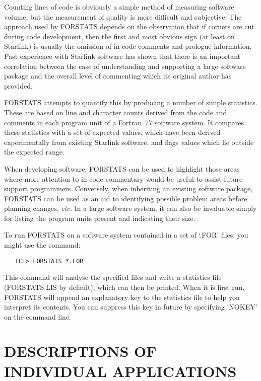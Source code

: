 Counting lines of code is obviously a simple method of measuring software
volume, but the measurement of quality is more difficult and subjective.
The approach used by FORSTATS depends on the observation that if corners are
cut during code development, then the first and most obvious sign (at least
on Starlink) is usually the omission of in-code comments and prologue
information.
Past experience with Starlink software has shown that there is an important
correlation between the ease of understanding and supporting a large
software package and the overall level of commenting which its original
author has provided.

FORSTATS attempts to quantify this by producing a number of simple
statistics.
These are based on line and character counts derived from the code and
comments in each program unit of a Fortran~77 software system.
It compares these statistics with a set of expected values, which have been
derived experimentally from existing Starlink software, and flags values
which lie outside the expected range.

When developing software, FORSTATS can be used to highlight those areas
where more attention to in-code commentary would be useful to assist future
support programmers.
Conversely, when inheriting an existing software package, FORSTATS can be
used as an aid to identifying possible problem areas before planning
changes, {\em etc.}
In a large software system, it can also be invaluable simply for listing the
program units present and indicating their size.

To run FORSTATS on a software system contained in a set of `.FOR' files, you
might use the command:

\begin{verbatim}
   ICL> FORSTATS *.FOR
\end{verbatim}

This command will analyse the specified files and write a statistics file
(FORSTATS.LIS by default), which can then be printed.
When it is first run, FORSTATS will append an explanatory key to the
statistics file to help you interpret its contents.
You can suppress this key in future by specifying `NOKEY' on the command
line.

\newpage
\appendix
\section{DESCRIPTIONS OF INDIVIDUAL APPLICATIONS}
\label{appendix:descriptions}

